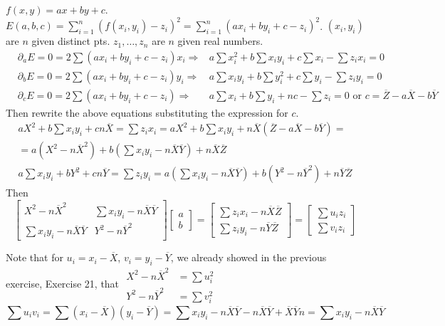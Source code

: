 \documentclass[twoside]{amsart}
\theoremstyle{plain}
\theoremstyle{definition}
\newcommand{\exercisehead}[1]
  {
   \noindent{\small\bf Exercise #1.}
   \smallskip}
\begin{document}
\exercisehead{22} $f(x,y) = ax + by +c$.  $E(a,b,c) = \sum_{i=1}^n (f(x_i,y_i) - z_i)^2 = \sum_{i=1}^n (ax_i + by_i + c - z_i)^2$.  $(x_i,y_i)$ are $n$ given distinct pts.  $z_1, \dots, z_n$ are $n$ given real numbers.  
\[
\begin{aligned}
  & \partial_a E = 0 = 2 \sum (ax_i + by_i +c - z_i ) x_i \Longrightarrow & a \sum x_i^2 + b \sum x_i y_i + c \sum x_i - \sum z_i x_i = 0 \\
  & \partial_b E = 0 = 2 \sum (ax_i + b y_i + c - z_i ) y_i \Longrightarrow & a \sum x_i y_i + b \sum y_i^2 + c \sum y_i - \sum z_i y_i = 0 \\
  & \partial_c E = 0 = 2 \sum (ax_i + b y_i + c - z_i ) \Longrightarrow & a \sum x_i + b \sum y_i + nc - \sum z_i = 0  \text{ or } c = \overline{Z} - a\overline{X} - b \overline{Y}
\end{aligned}
\]
Then rewrite the above equations substituting the expression for $c$.  
\[
\begin{gathered}
  aX^2 + b \sum x_i y_i + cn \overline{X} = \sum z_i x_i = aX^2 + b \sum x_i y_i + n \overline{X} (\overline{Z} - a\overline{X} - b\overline{Y}) = \\
  = a(X^2 - n\overline{X}^2 ) + b ( \sum x_i y_i - n \overline{X} \overline{Y}) + n\overline{X}\overline{Z} \\ 
  a\sum x_i y_i  + bY^2 + cn \overline{Y} = \sum z_i y_i = a ( \sum x_i y_i - n\overline{X} \overline{Y}) + b (Y^2 - n \overline{Y}^2 ) + n\overline{Y} \overline{Z} 
\end{gathered}
\]
Then \[
\left[ \begin{matrix} X^2 - n \overline{X}^2 & \sum x_i y_i - n\overline{X} \overline{Y} \\ \sum x_i y_i - n \overline{X} \overline{Y} & Y^2 - n\overline{Y}^2 \end{matrix} \right]\left[ \begin{matrix} a \\ b \end{matrix} \right] = \left[ \begin{matrix} \sum z_i x_i - n \overline{X} \overline{Z} \\ \sum z_i y_i - n \overline{Y} \overline{Z} \end{matrix} \right] = \left[ \begin{matrix} \sum u_i z_i \\ \sum v_i z_i \end{matrix} \right]
\]

Note that for $u_i = x_i - \overline{X}$, $v_i = y_i - \overline{Y}$, we already showed in the previous exercise, Exercise 21, that $ \begin{aligned} X^2 - n\overline{X}^2  & = \sum u_i^2 \\ Y^2 - n\overline{Y}^2 & = \sum v_i^2 \end{aligned} $
\[
\sum u_i v_i = \sum (x_i-\overline{X})(y_i - \overline{Y}) = \sum x_i y_i - n \overline{X} \overline{Y} - n \overline{X} \overline{Y} + \overline{X} \overline{Y} n = \sum x_i y_i - n \overline{X} \overline{Y}
\]
\end{document}
